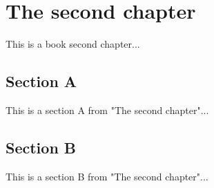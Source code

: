 \chapter{The second chapter}

This is a book second chapter...

\section{Section A}

This is a section A from "The second chapter"...

\section{Section B}

This is a section B from "The second chapter"...


